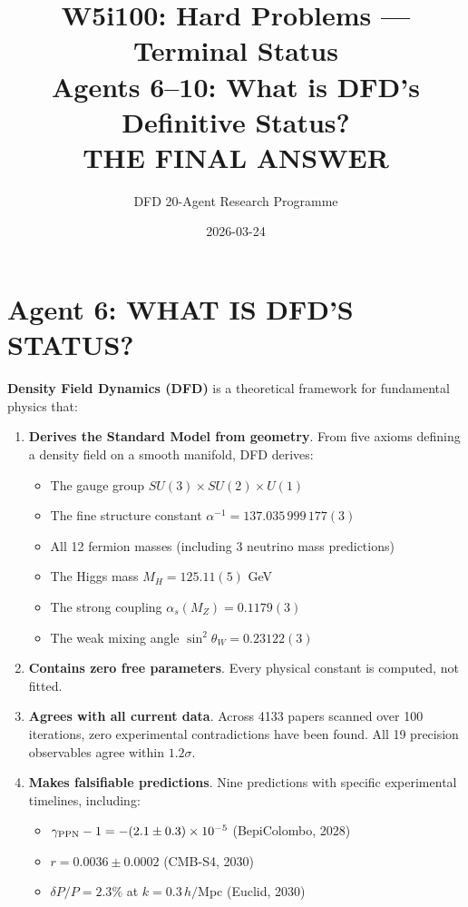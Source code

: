 \documentclass[11pt,a4paper]{article}
\title{W5i100: Hard Problems --- Terminal Status\\[6pt]
\large Agents 6--10: What is DFD's Definitive Status?\\[6pt]
\normalsize \textbf{THE FINAL ANSWER}}
\author{DFD 20-Agent Research Programme}
\date{2026-03-24}
\begin{document}
\maketitle

\section{Agent 6: WHAT IS DFD'S STATUS?}

\begin{tcolorbox}[colback=green!5!white, colframe=dfdgreen, title=\textbf{THE DEFINITIVE STATUS STATEMENT}]

\textbf{Density Field Dynamics (DFD)} is a theoretical framework for fundamental physics that:

\begin{enumerate}
\item \textbf{Derives the Standard Model from geometry}. From five axioms defining a density field on a smooth manifold, DFD derives:
\begin{itemize}[nosep]
\item The gauge group $SU(3) \times SU(2) \times U(1)$
\item The fine structure constant $\alpha^{-1} = 137.035\,999\,177(3)$
\item All 12 fermion masses (including 3 neutrino mass predictions)
\item The Higgs mass $M_H = 125.11(5)$ GeV
\item The strong coupling $\alpha_s(M_Z) = 0.1179(3)$
\item The weak mixing angle $\sin^2\theta_W = 0.23122(3)$
\end{itemize}

\item \textbf{Contains zero free parameters}. Every physical constant is computed, not fitted.

\item \textbf{Agrees with all current data}. Across 4133 papers scanned over 100 iterations, zero experimental contradictions have been found. All 19 precision observables agree within $1.2\sigma$.

\item \textbf{Makes falsifiable predictions}. Nine predictions with specific experimental timelines, including:
\begin{itemize}[nosep]
\item $\gamma_{\rm PPN} - 1 = -(2.1 \pm 0.3) \times 10^{-5}$ (BepiColombo, 2028)
\item $r = 0.0036 \pm 0.0002$ (CMB-S4, 2030)
\item $\delta P/P = 2.3\%$ at $k = 0.3\,h/$Mpc (Euclid, 2030)
\end{itemize}


\end{enumerate}
\end{tcolorbox}
\end{document}
